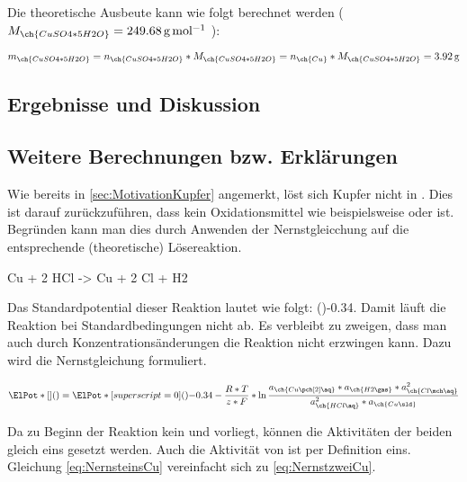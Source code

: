 \documentclass{article}
\begin{document}
        Die theoretische Ausbeute kann wie folgt berechnet werden ($M_{\ch{CuSO4 * 5 H2O}} = \SI[mode=text]{249.68}{\gram\per\mole}$ ):
        
        \begin{equation}
          m_{\ch{CuSO4 * 5 H2O}} = n_{\ch{CuSO4 * 5 H2O}} * M_{\ch{CuSO4 * 5 H2O}} = n_{\ch{Cu}}  * M_{\ch{CuSO4 * 5 H2O}} = \SI[mode=text]{3.92}{\gram}
        \end{equation}
        
    \subsection{Ergebnisse und Diskussion}

    \subsection{Weitere Berechnungen bzw. Erklärungen}
    
      Wie bereits in \ref{sec:MotivationKupfer} angemerkt, löst sich Kupfer nicht in . Dies ist darauf zurückzuführen, dass  kein Oxidationsmittel wie beispielsweise  oder  ist. Begründen kann man dies durch Anwenden der Nernstgleicchung auf die entsprechende (theoretische) Lösereaktion.
      
      \begin{reaction}
        Cu\sld{} + 2 HCl\aq{} -> Cu\pch[2]\aq{} + 2 Cl\mch\aq{} + H2\gas \label{rec:LosenCuHCl}
      \end{reaction}
      
      Das Standardpotential dieser Reaktion lautet wie folgt: \ElPot[superscript=0](){-0.34}. Damit läuft die Reaktion bei Standardbedingungen nicht ab. Es verbleibt zu zweigen, dass man auch durch Konzentrationsänderungen die Reaktion nicht erzwingen kann. Dazu wird die Nernstgleichung formuliert.
      
      \begin{equation}
        \ElPot*[](){} = \ElPot*[superscript=0](){-0.34} - \frac{R*T}{z*F} * \ln {\frac{a_{\ch{Cu\pch[2]\aq}}*a_{\ch{H2\gas}}*a_{\ch{Cl\mch\aq}}^2}{a_{\ch{HCl\aq}}^2 * a_{\ch{Cu\sld}}}} \label{eq:NernsteinsCu}
      \end{equation}
      
      Da zu Beginn der Reaktion kein  und  vorliegt, können die Aktivitäten der beiden gleich eins gesetzt werden. Auch die Aktivität von  ist per Definition eins. Gleichung \eqref{eq:NernsteinsCu} vereinfacht sich zu \eqref{eq:NernstzweiCu}.
      
\end{document}

